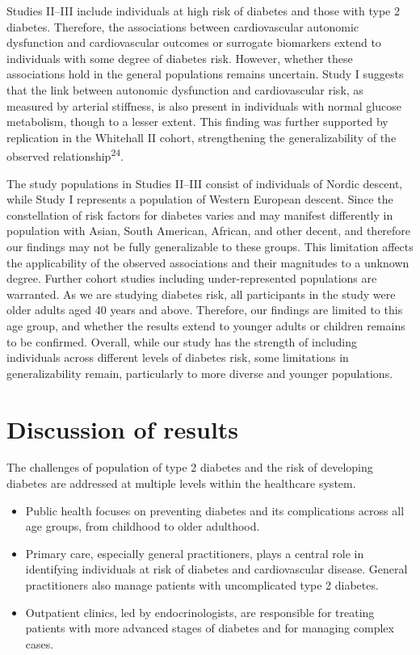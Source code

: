 \documentclass[
  a4paper,
  headsepline=true,
  open=any]{scrbook}
\begin{document}
Studies II--III include individuals at high risk of diabetes and those
with type 2 diabetes. Therefore, the associations between cardiovascular
autonomic dysfunction and cardiovascular outcomes or surrogate
biomarkers extend to individuals with some degree of diabetes risk.
However, whether these associations hold in the general populations
remains uncertain. Study I suggests that the link between autonomic
dysfunction and cardiovascular risk, as measured by arterial stiffness,
is also present in individuals with normal glucose metabolism, though to
a lesser extent. This finding was further supported by replication in
the Whitehall II cohort, strengthening the generalizability of the
observed relationship\textsuperscript{24}.

The study populations in Studies II--III consist of individuals of
Nordic descent, while Study I represents a population of Western
European descent. Since the constellation of risk factors for diabetes
varies and may manifest differently in population with Asian, South
American, African, and other decent, and therefore our findings may not
be fully generalizable to these groups. This limitation affects the
applicability of the observed associations and their magnitudes to a
unknown degree. Further cohort studies including under-represented
populations are warranted. As we are studying diabetes risk, all
participants in the study were older adults aged 40 years and above.
Therefore, our findings are limited to this age group, and whether the
results extend to younger adults or children remains to be confirmed.
Overall, while our study has the strength of including individuals
across different levels of diabetes risk, some limitations in
generalizability remain, particularly to more diverse and younger
populations.

\hypertarget{discussion-of-results}{%
\section{Discussion of results}\label{discussion-of-results}}

The challenges of population of type 2 diabetes and the risk of
developing diabetes are addressed at multiple levels within the
healthcare system.

\begin{itemize}
\item
  Public health focuses on preventing diabetes and its complications
  across all age groups, from childhood to older adulthood.
\item
  Primary care, especially general practitioners, plays a central role
  in identifying individuals at risk of diabetes and cardiovascular
  disease. General practitioners also manage patients with uncomplicated
  type 2 diabetes.
\item
  Outpatient clinics, led by endocrinologists, are responsible for
  treating patients with more advanced stages of diabetes and for
  managing complex cases.
\end{itemize}
\end{document}
